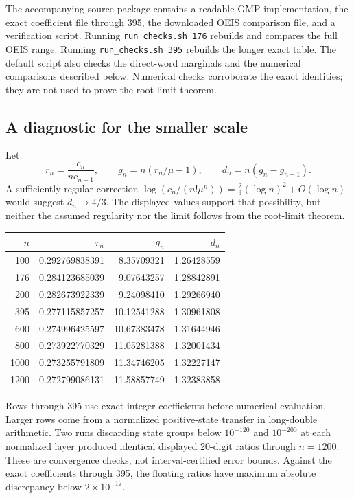 \documentclass[11pt,letterpaper]{article}
\theoremstyle{remark}
\newcommand{\muval}{\mu}
\begin{document}
The accompanying source package contains a readable GMP implementation, the exact coefficient file through 395, the downloaded OEIS comparison file, and a verification script. Running \texttt{run\_checks.sh 176} rebuilds and compares the full OEIS range. Running \texttt{run\_checks.sh 395} rebuilds the longer exact table. The default script also checks the direct-word marginals and the numerical comparisons described below. Numerical checks corroborate the exact identities; they are not used to prove the root-limit theorem.

\subsection{A diagnostic for the smaller scale}
Let
\[
 r_n=\frac{c_n}{nc_{n-1}},\qquad
 g_n=n(r_n/\muval-1),\qquad
 d_n=n(g_n-g_{n-1}).
\]
A sufficiently regular correction $\log(c_n/(n!\muval^n))=\frac23(\log n)^2+O(\log n)$ would suggest $d_n\to4/3$. The displayed values support that possibility, but neither the assumed regularity nor the limit follows from the root-limit theorem.
\begin{center}
\begin{tabular}{rrrr}
\toprule
$n$ & $r_n$ & $g_n$ & $d_n$\\
\midrule
100 & 0.292769838391 & 8.35709321 & 1.26428559 \\
176 & 0.284123685039 & 9.07643257 & 1.28842891 \\
200 & 0.282673922339 & 9.24098410 & 1.29266940 \\
395 & 0.277115857257 & 10.12541288 & 1.30961808 \\
600 & 0.274996425597 & 10.67383478 & 1.31644946 \\
800 & 0.273922770329 & 11.05281388 & 1.32001434 \\
1000 & 0.273255791809 & 11.34746205 & 1.32227147 \\
1200 & 0.272799086131 & 11.58857749 & 1.32383858 \\
\bottomrule
\end{tabular}
\end{center}
Rows through 395 use exact integer coefficients before numerical evaluation. Larger rows come from a normalized positive-state transfer in long-double arithmetic. Two runs discarding state groups below $10^{-120}$ and $10^{-200}$ at each normalized layer produced identical displayed 20-digit ratios through $n=1200$. These are convergence checks, not interval-certified error bounds. Against the exact coefficients through 395, the floating ratios have maximum absolute discrepancy below $2\times10^{-17}$.
\end{document}
